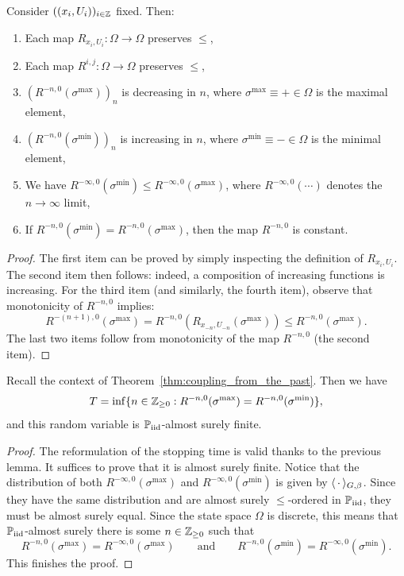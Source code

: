 \begin{lemma}
    Consider $((x_i,U_i))_{i\in\mathbb Z}$ fixed. Then:
    \begin{enumerate}
        \item Each map $R_{x_i,U_i}:\Omega\to\Omega$ preserves $\leq$,
        \item Each map $R^{i,j}:\Omega\to\Omega$ preserves $\leq$,
        \item $(R^{-n,0}(\sigma^{\max}))_n$ is decreasing in $n$, where
            $\sigma^{\max}\equiv+\in\Omega$ is the maximal element,
        \item $(R^{-n,0}(\sigma^{\min}))_n$ is increasing in $n$, where
            $\sigma^{\min}\equiv-\in\Omega$ is the minimal element,
        \item We have $R^{-\infty,0}(\sigma^{\min})\leq R^{-\infty,0}(\sigma^{\max})$,
            where $R^{-\infty,0}(\cdots)$ denotes the $n\to\infty$ limit,
        \item If  $R^{-n,0}(\sigma^{\min})= R^{-n,0}(\sigma^{\max})$, then the map
            $R^{-n,0}$ is constant.
    \end{enumerate}
\end{lemma}

\begin{proof}
    The first item can be proved by simply inspecting the definition of $R_{x_i,U_i}$.
    The second item then follows: indeed, a composition of increasing functions is increasing.
    For the third item (and similarly, the fourth item), observe that monotonicity of
    $R^{-n,0}$ implies:
    \[
        R^{-(n+1),0}(\sigma^{\max})
        =
        R^{-n,0}(R_{x_{-n},U_{-n}}(\sigma^{\max}))
        \leq
        R^{-n,0}(\sigma^{\max}).
    \]
    The last two items follow from monotonicity of the map $R^{-n,0}$ (the second item).
\end{proof}

\begin{lemma}
    Recall the context of Theorem~\ref{thm:coupling_from_the_past}.
    Then we have
    \[
        T=\inf\{n\in\mathbb Z_{\geq 0}:R^{-n,0}(\sigma^{\max})=R^{-n,0}(\sigma^{\min})\},
    \]
    and this random variable is $\mathbb P_{\operatorname{iid}}$-almost surely finite.
\end{lemma}

\begin{proof}
    The reformulation of the stopping time is valid thanks to the previous lemma.
    It suffices to prove that it is almost surely finite.
    Notice that the distribution of both $R^{-\infty,0}(\sigma^{\max})$ and
    $R^{-\infty,0}(\sigma^{\min})$
    is given by $\langle\,\cdot\,\rangle_{G,\beta}$.
    Since they have the same distribution and are almost surely $\leq$-ordered in $\mathbb P_{\operatorname{iid}}$,
    they must be almost surely equal.
    Since the state space $\Omega$ is discrete,
    this means that $\mathbb P_{\operatorname{iid}}$-almost surely
    there is some $n\in\mathbb Z_{\geq 0}$ such that
    \[
        R^{-n,0}(\sigma^{\max})=
        R^{-\infty,0}(\sigma^{\max})
        \qquad
        \text{and}
        \qquad
        R^{-n,0}(\sigma^{\min})=
        R^{-\infty,0}(\sigma^{\min}).
    \]
    This finishes the proof.
\end{proof}
